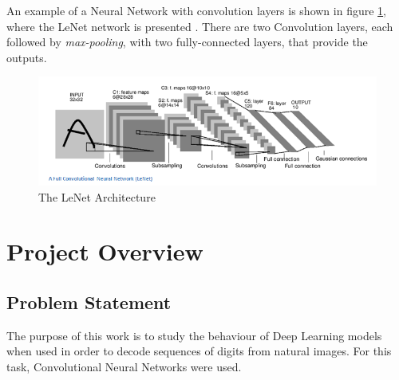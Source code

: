 \documentclass[final,12p,times]{elsarticle}
\begin{document}
An example of a Neural Network with convolution layers is shown in figure \ref{fig:Fig2.6}, where the LeNet network is presented \cite{Lecun98gradient-basedlearning}.
There are two Convolution layers, each followed by \emph{max-pooling}, with two fully-connected layers, that provide the outputs.

\begin{figure}[H]
  \includegraphics[width=1.0\textwidth, center]{LeNet.png}
  \caption{The LeNet Architecture}
  \label{fig:Fig2.6}
  \end{figure}


\section{Project Overview}
\subsection{Problem Statement}
\label{sec:3.1}
The purpose of this work is to study the behaviour of Deep Learning models when used in order to decode sequences of digits from natural 
images.
For this task, Convolutional Neural Networks were used. 
\end{document}
